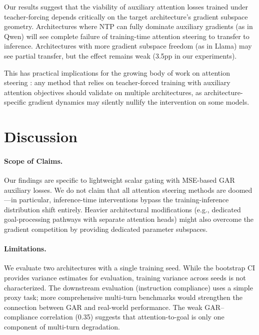 \documentclass[11pt,a4paper]{article}
\begin{document}
Our results suggest that the viability of auxiliary attention losses trained under teacher-forcing depends critically on the target architecture's gradient subspace geometry.
Architectures where NTP can fully dominate auxiliary gradients (as in Qwen) will see complete failure of training-time attention steering to transfer to inference.
Architectures with more gradient subspace freedom (as in Llama) may see partial transfer, but the effect remains weak (3.5pp in our experiments).

This has practical implications for the growing body of work on attention steering \citep{dongre2026multiturn,qiu2025gated}: any method that relies on teacher-forced training with auxiliary attention objectives should validate on multiple architectures, as architecture-specific gradient dynamics may silently nullify the intervention on some models.

\section{Discussion}
\label{sec:discussion}

\paragraph{Scope of Claims.}
Our findings are specific to lightweight scalar gating with MSE-based GAR auxiliary losses.
We do not claim that all attention steering methods are doomed---in particular, inference-time interventions \citep{li2023inference,turner2023activation} bypass the training-inference distribution shift entirely.
Heavier architectural modifications (e.g., dedicated goal-processing pathways with separate attention heads) might also overcome the gradient competition by providing dedicated parameter subspaces.

\paragraph{Limitations.}
We evaluate two architectures with a single training seed.
While the bootstrap CI provides variance estimates for evaluation, training variance across seeds is not characterized.
The downstream evaluation (instruction compliance) uses a simple proxy task; more comprehensive multi-turn benchmarks would strengthen the connection between GAR and real-world performance.
The weak GAR--compliance correlation (0.35) suggests that attention-to-goal is only one component of multi-turn degradation.
\end{document}
